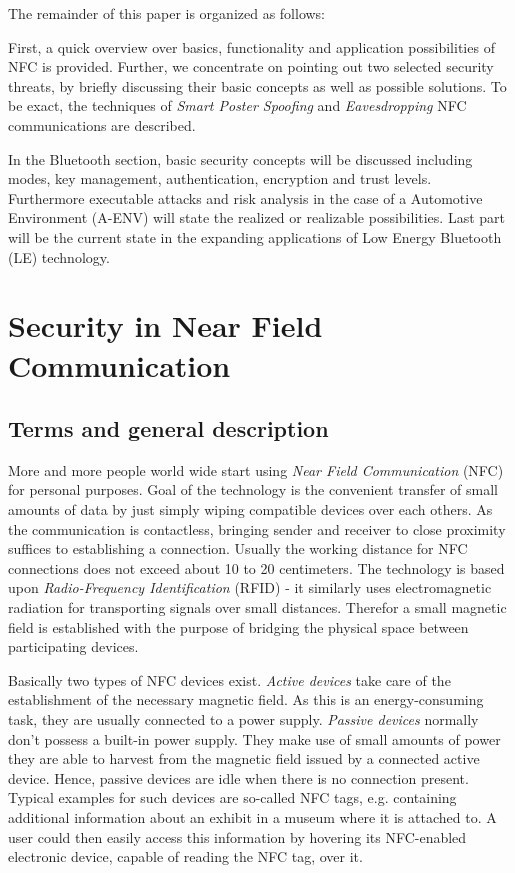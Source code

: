 \documentclass[12pt,a4paper]{article}
\begin{document}
The remainder of this paper is organized as follows:

First, a quick overview over basics, functionality and application possibilities of NFC is provided. Further, we concentrate on pointing out two selected security threats, by briefly discussing their basic concepts as well as possible solutions. To be exact, the techniques of \emph{Smart Poster Spoofing} and \emph{Eavesdropping} NFC communications are described.

In the Bluetooth section, basic security concepts will be discussed including modes, key management, authentication, encryption and trust levels. Furthermore executable attacks and risk analysis in the case of a Automotive Environment (A-ENV) will state the realized or realizable possibilities. Last part will be the current state in the expanding applications of Low Energy Bluetooth (LE) technology.

\section{Security in Near Field Communication}

\subsection{Terms and general description}

More and more people world wide start using \emph{Near Field Communication} (NFC) for personal purposes. Goal of the technology is the convenient transfer of small amounts of data by just simply wiping compatible devices over each others. As the communication is contactless, bringing sender and receiver to close proximity suffices to establishing a connection. Usually the working distance for NFC connections does not exceed about 10 to 20 centimeters. The technology is based upon \emph{Radio-Frequency Identification} (RFID) - it 	similarly uses electromagnetic radiation for transporting signals over small distances. Therefor a small magnetic field is established with the purpose of bridging the physical space between participating devices.

Basically two types of NFC devices exist. \emph{Active devices} take care of the establishment of the necessary magnetic field. As this is an energy-consuming task, they are usually connected to a power supply. \emph{Passive devices} normally don't possess a built-in power supply. They make use of small amounts of power they are able to harvest from the magnetic field issued by a connected active device. Hence, passive devices are idle when there is no connection present. Typical examples for such devices are so-called NFC tags, e.g. containing additional information about an exhibit in a museum where it is attached to. A user could then easily access this information by hovering its NFC-enabled electronic device, capable of reading the NFC tag, over it.
\end{document}
